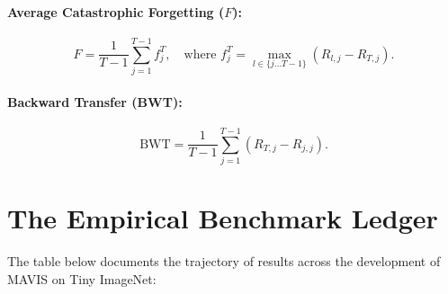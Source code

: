 \documentclass[11pt,a4paper]{article}
\begin{document}
    \paragraph{Average Catastrophic Forgetting ($F$):}
    \begin{equation}
        F = \frac{1}{T-1} \sum_{j=1}^{T-1} f_j^T, \quad \text{where } f_j^T = \max_{l \in \{j \dots T-1\}} (R_{l, j} - R_{T, j}).
    \end{equation}

    \paragraph{Backward Transfer (BWT):}
    \begin{equation}
        \text{BWT} = \frac{1}{T-1} \sum_{j=1}^{T-1} (R_{T, j} - R_{j, j}).
    \end{equation}

    \newpage

    \section{The Empirical Benchmark Ledger}
    \label{sec:benchmark-ledger}

    The table below documents the trajectory of results across the development of MAVIS on Tiny ImageNet:
\end{document}

